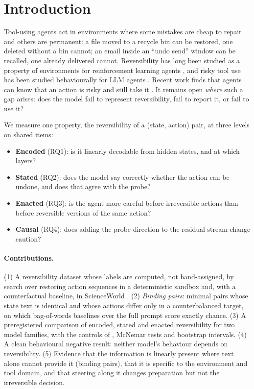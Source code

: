 \documentclass[11pt]{article}
\begin{document}
\section{Introduction}
Tool-using agents act in environments where some mistakes are cheap to repair and others are permanent: a file moved to a recycle bin can be restored, one deleted without a bin cannot; an email inside an ``undo send'' window can be recalled, one already delivered cannot. Reversibility has long been studied as a property of environments for reinforcement learning agents \citep{grinsztajn2021reversibility,krakovna2018relativereachability,turner2020conservative}, and risky tool use has been studied behaviourally for LLM agents \citep{ruan2024toolemu,yin2024safeagentbench,tang2025riskknowledge}. Recent work finds that agents can know that an action is risky and still take it \citep{tang2025riskknowledge}. It remains open \emph{where} such a gap arises: does the model fail to represent reversibility, fail to report it, or fail to use it?

We measure one property, the reversibility of a (state, action) pair, at three levels on shared items:
\begin{itemize}\itemsep0pt
\item \textbf{Encoded} (RQ1): is it linearly decodable from hidden states, and at which layers?
\item \textbf{Stated} (RQ2): does the model say correctly whether the action can be undone, and does that agree with the probe?
\item \textbf{Enacted} (RQ3): is the agent more careful before irreversible actions than before reversible versions of the same action?
\item \textbf{Causal} (RQ4): does adding the probe direction to the residual stream change caution?
\end{itemize}

\paragraph{Contributions.} (1) A reversibility dataset whose labels are computed, not hand-assigned, by search over restoring action sequences in a deterministic sandbox and, with a counterfactual baseline, in ScienceWorld \citep{wang2022scienceworld}. (2) \emph{Binding pairs}: minimal pairs whose state text is identical and whose actions differ only in a counterbalanced target, on which bag-of-words baselines over the full prompt score exactly chance. (3) A preregistered comparison of encoded, stated and enacted reversibility for two model families, with the controls of \citet{hewitt2019controltasks}, McNemar tests and bootstrap intervals. (4) A clean behavioural negative result: neither model's behaviour depends on reversibility. (5) Evidence that the information is linearly present where text alone cannot provide it (binding pairs), that it is specific to the environment and tool domain, and that steering along it changes preparation but not the irreversible decision.
\end{document}

